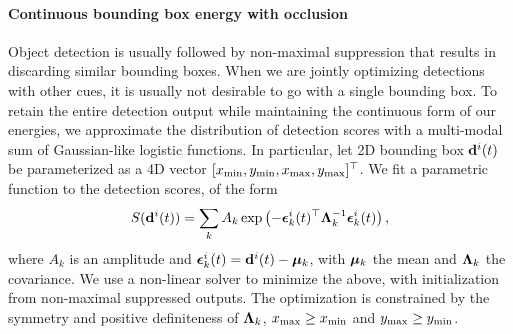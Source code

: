 \vspace{-0.3cm}
\paragraph{Continuous bounding box energy with occlusion}
Object detection is usually followed by non-maximal suppression that results in discarding similar bounding boxes. When we are jointly optimizing detections with other cues, it is usually not desirable to go with a single bounding box. To retain the entire detection output while maintaining the continuous form of our energies, we approximate the distribution of detection scores with a multi-modal sum of Gaussian-like logistic functions. In particular, let 2D bounding box $\mathbf{d}^{i}(t)$ be parameterized as a 4D vector $[x_{\text{min}}, y_{\text{min}}, x_{\text{max}}, y_{\text{max}}]^\top$. We fit a parametric function to the detection scores, of the form
\begin{equation}
S(\mathbf{d}^{i}(t)) = \sum_k A_k \exp \left( -{\bm{\epsilon}}_k^{i}(t)^\top \bm{\Lambda}_k^{-1} {\bm{\epsilon}}_k^{i}(t) \right),
\end{equation}
where $A_k$ is an amplitude and ${\bm{\epsilon}}_k^{i}(t) = \mathbf{d}^{i}(t)-{\bm{\mu}}_k$, with ${\bm{\mu}}_k$ the mean and $\bm{\Lambda}_k$ the covariance.
We use a non-linear solver to minimize the above, with initialization from non-maximal suppressed outputs. The optimization is constrained by the symmetry and positive definiteness of $\bm{\Lambda}_k$, $x_{\text{max}} \ge x_{\text{min}}$ and $y_{\text{max}} \ge y_{\text{min}}$.

